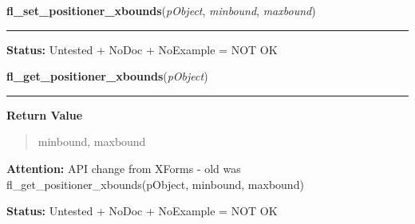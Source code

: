     \vspace{0.5ex}

\hspace{.8\funcindent}\begin{boxedminipage}{\funcwidth}

    \raggedright \textbf{fl\_set\_positioner\_xbounds}(\textit{pObject}, \textit{minbound}, \textit{maxbound})

    \vspace{-1.5ex}

    \rule{\textwidth}{0.5\fboxrule}
\setlength{\parskip}{2ex}
\setlength{\parskip}{1ex}
\textbf{Status:} Untested + NoDoc + NoExample = NOT OK



    \end{boxedminipage}

    \label{xformslib:library:fl_get_positioner_xbounds}

    \vspace{0.5ex}

\hspace{.8\funcindent}\begin{boxedminipage}{\funcwidth}

    \raggedright \textbf{fl\_get\_positioner\_xbounds}(\textit{pObject})

    \vspace{-1.5ex}

    \rule{\textwidth}{0.5\fboxrule}
\setlength{\parskip}{2ex}
\setlength{\parskip}{1ex}
      \textbf{Return Value}
    \vspace{-1ex}

      \begin{quote}
      minbound, maxbound

      \end{quote}

\textbf{Attention:} API change from XForms - old was fl\_get\_positioner\_xbounds(pObject, 
minbound, maxbound)



\textbf{Status:} Untested + NoDoc + NoExample = NOT OK



    \end{boxedminipage}

    \label{xformslib:library:fl_set_positioner_yvalue}

